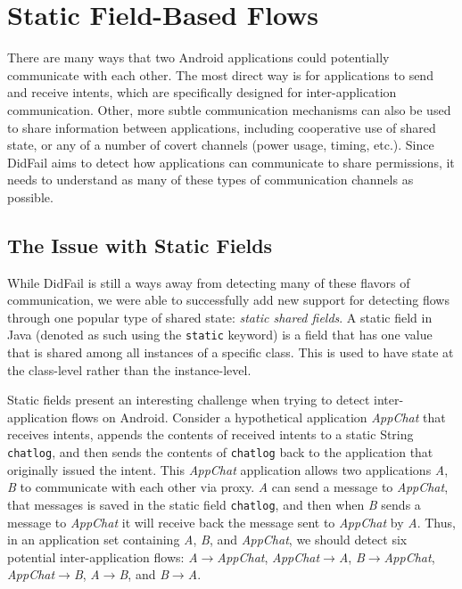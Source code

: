 \chapter{Static Field-Based Flows}

There are many ways that two Android applications could potentially communicate with each other. The most direct way is for applications to send and receive intents, which are specifically designed for inter-application communication. Other, more subtle communication mechanisms can also be used to share information between applications, including cooperative use of shared state, or any of a number of covert channels (power usage, timing, etc.). Since DidFail aims to detect how applications can communicate to share permissions, it needs to understand as many of these types of communication channels as possible.

\section{The Issue with Static Fields}

While DidFail is still a ways away from detecting many of these flavors of communication, we were able to successfully add new support for detecting flows through one popular type of shared state: \emph{static shared fields}. A static field in Java (denoted as such using the \texttt{static} keyword) is a field that has one value that is shared among all instances of a specific class. This is used to have state at the class-level rather than the instance-level.

Static fields present an interesting challenge when trying to detect inter-application flows on Android. Consider a hypothetical application \emph{AppChat} that receives intents, appends the contents of received intents to a static String \texttt{chatlog}, and then sends the contents of \texttt{chatlog} back to the application that originally issued the intent. This \emph{AppChat} application allows two applications \emph{A}, \emph{B} to communicate with each other via proxy. \emph{A} can send a message to \emph{AppChat}, that messages is saved in the static field \texttt{chatlog}, and then when \emph{B} sends a message to \emph{AppChat} it will receive back the message sent to \emph{AppChat} by \emph{A}. Thus, in an application set containing \emph{A}, \emph{B}, and \emph{AppChat}, we should detect six potential inter-application flows: \emph{A$\rightarrow$AppChat}, \emph{AppChat$\rightarrow$A}, \emph{B$\rightarrow$AppChat}, \emph{AppChat$\rightarrow$B}, \emph{A$\rightarrow$B}, and \emph{B$\rightarrow$A}.

